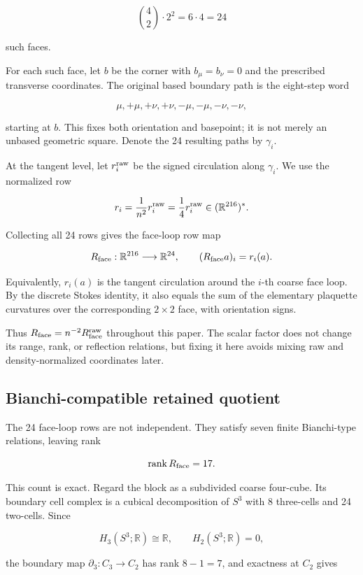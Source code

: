 \documentclass[10pt]{article}
\begin{document}
\[
\binom42\cdot2^2=6\cdot4=24
\]

such faces.

For each such face, let \(b\) be the corner with \(b_\mu=b_\nu=0\) and the prescribed transverse coordinates.  The original based boundary path is the eight-step word

\[
\mu,+\mu,+\nu,+\nu,-\mu,-\mu,-\nu,-\nu,
\]

starting at \(b\).  This fixes both orientation and basepoint; it is not merely an unbased geometric square.  Denote the 24 resulting paths by \(\gamma_i\).

At the tangent level, let \(r_i^{\rm raw}\) be the signed circulation along \(\gamma_i\).  We use the normalized row

\[
r_i=\frac1{n^2}r_i^{\rm raw}=\frac14r_i^{\rm raw}
\in(\mathbb R^{216})^\ast.
\]

Collecting all 24 rows gives the face-loop row map

\[
R_{\rm face}: \mathbb R^{216}\longrightarrow\mathbb R^{24},
\qquad
(R_{\rm face}a)_i=r_i(a).
\]

Equivalently, \(r_i(a)\) is the tangent circulation around the \(i\)-th coarse face loop.  By the discrete Stokes identity, it also equals the sum of the elementary plaquette curvatures over the corresponding \(2\times2\) face, with orientation signs.

Thus \(R_{\rm face}=n^{-2}R_{\rm face}^{\rm raw}\) throughout this paper.  The scalar factor does not change its range, rank, or reflection relations, but fixing it here avoids mixing raw and density-normalized coordinates later.

\subsection{Bianchi-compatible retained quotient}

The 24 face-loop rows are not independent.  They satisfy seven finite Bianchi-type relations, leaving rank

\[
\operatorname{rank}R_{\rm face}=17.
\]

This count is exact.  Regard the block as a subdivided coarse four-cube.  Its boundary cell complex is a cubical decomposition of \(S^3\) with 8 three-cells and 24 two-cells.  Since

\[
H_3(S^3;\mathbb R)\cong\mathbb R,
\qquad
H_2(S^3;\mathbb R)=0,
\]

the boundary map \(\partial_3:C_3\to C_2\) has rank \(8-1=7\), and exactness at \(C_2\) gives
\end{document}
